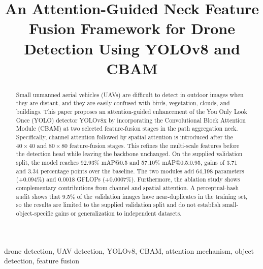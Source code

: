 \documentclass[conference]{IEEEtran}
\begin{document}
\title{An Attention-Guided Neck Feature Fusion Framework for Drone Detection Using YOLOv8 and CBAM}

\author{
}

\maketitle

\begin{abstract}
Small unmanned aerial vehicles (UAVs) are difficult to detect in outdoor images when they are distant, and they are easily confused with birds, vegetation, clouds, and buildings. This paper proposes an attention-guided enhancement of the You Only Look Once (YOLO) detector YOLOv8x by incorporating the Convolutional Block Attention Module (CBAM) at two selected feature-fusion stages in the path aggregation neck. Specifically, channel attention followed by spatial attention is introduced after the $40\times40$ and $80\times80$ feature-fusion stages. This refines the multi-scale features before the detection head while leaving the backbone unchanged. On the supplied validation split, the model reaches 92.93\% mAP@0.5 and 57.10\% mAP@0.5:0.95, gains of 3.71 and 3.34 percentage points over the baseline. The two modules add 64,198 parameters (+0.094\%) and 0.0018 GFLOPs (+0.0007\%). Furthermore, the ablation study shows complementary contributions from channel and spatial attention. A perceptual-hash audit shows that 9.5\% of the validation images have near-duplicates in the training set, so the results are limited to the supplied validation split and do not establish small-object-specific gains or generalization to independent datasets.
\end{abstract}

\begin{IEEEkeywords}
drone detection, UAV detection, YOLOv8, CBAM, attention mechanism, object detection, feature fusion
\end{IEEEkeywords}
\end{document}
